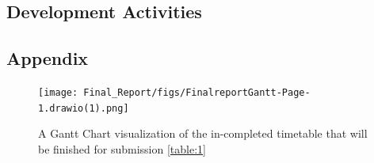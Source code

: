 \documentclass[11pt,letterpaper]{article}
\begin{document}
\newpage
\begin{flushleft}
\justifying






\section{Development Activities}


















\end{flushleft}
\begin{landscape}

\section*{Appendix}
\begin{figure}[htbp]
\centering
\texttt{[image: Final\_Report/figs/FinalreportGantt-Page-1.drawio(1).png]}
\caption{A Gantt Chart visualization of the in-completed timetable that will be finished for submission \ref{table:1}}
\label{fig:Appendix}
\end{figure}
\end{landscape}
\end{document}
